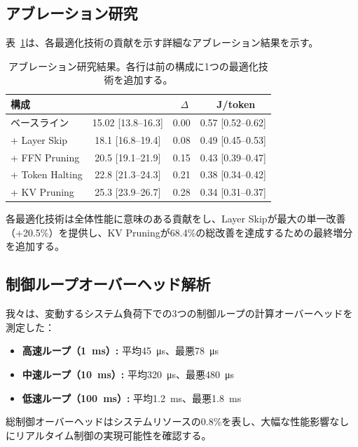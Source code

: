 \documentclass[10pt,twocolumn,a4paper]{jarticle}
\newcommand{\tps}{\text{tok/s}}
\newcommand{\ppl}{\mathrm{PPL}}
\begin{document}
\subsection{アブレーション研究}

表~\ref{tab:ablation}は、各最適化技術の貢献を示す詳細なアブレーション結果を示す。

\begin{table}[t]
\centering
\small
\caption{アブレーション研究結果。各行は前の構成に1つの最適化技術を追加する。}
\label{tab:ablation}
\begin{tabular}{@{}lccc@{}}
\toprule
\textbf{構成} & \textbf{\tps} & \textbf{\ppl\ $\Delta$} & \textbf{\SI{}{J/token}} \\
\midrule
ベースライン & 15.02 [13.8--16.3] & 0.00 & 0.57 [0.52--0.62] \\
+ Layer Skip & 18.1 [16.8--19.4] & 0.08 & 0.49 [0.45--0.53] \\
+ FFN Pruning & 20.5 [19.1--21.9] & 0.15 & 0.43 [0.39--0.47] \\
+ Token Halting & 22.8 [21.3--24.3] & 0.21 & 0.38 [0.34--0.42] \\
+ KV Pruning & 25.3 [23.9--26.7] & 0.28 & 0.34 [0.31--0.37] \\
\bottomrule
\end{tabular}
\end{table}

各最適化技術は全体性能に意味のある貢献をし、Layer Skipが最大の単一改善（+20.5\%）を提供し、KV Pruningが68.4\%の総改善を達成するための最終増分を追加する。

\subsection{制御ループオーバーヘッド解析}

我々は、変動するシステム負荷下での3つの制御ループの計算オーバーヘッドを測定した：

\begin{itemize}
\item \textbf{高速ループ（\SI{1}{ms}）:} 平均\SI{45}{\micro s}、最悪\SI{78}{\micro s}
\item \textbf{中速ループ（\SI{10}{ms}）:} 平均\SI{320}{\micro s}、最悪\SI{480}{\micro s}  
\item \textbf{低速ループ（\SI{100}{ms}）:} 平均\SI{1.2}{ms}、最悪\SI{1.8}{ms}
\end{itemize}

総制御オーバーヘッドはシステムリソースの0.8\%を表し、大幅な性能影響なしにリアルタイム制御の実現可能性を確認する。
\end{document}

